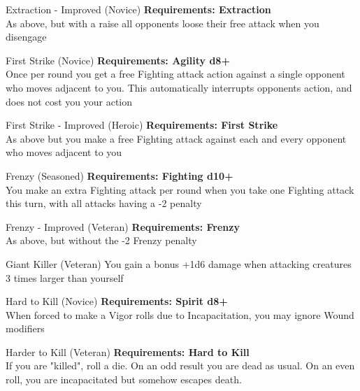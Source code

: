 \begin{multicols}{2}
\begin{genericsection}{Extraction - Improved (Novice)}
\textbf{Requirements: Extraction}\\
As above, but with a raise all opponents loose their free attack when you disengage
\end{genericsection}

\begin{genericsection}{First Strike (Novice)}
\textbf{Requirements: Agility d8+}\\
Once per round you get a free Fighting attack action against a single opponent who moves adjacent to you. This automatically interrupts opponents action, and does not cost you your action
\end{genericsection}

\begin{genericsection}{First Strike - Improved (Heroic)}
\textbf{Requirements: First Strike}\\
As above but you make a free Fighting attack against each and every opponent who moves adjacent to you
\end{genericsection}

\begin{genericsection}{Frenzy (Seasoned)}
\textbf{Requirements: Fighting d10+}\\
You make an extra Fighting attack per round when you take one Fighting attack this turn, with all attacks having a -2 penalty
\end{genericsection}

\begin{genericsection}{Frenzy - Improved (Veteran)}
\textbf{Requirements: Frenzy}\\
As above, but without the -2 Frenzy penalty
\end{genericsection}

\begin{genericsection}{Giant Killer (Veteran)}
You gain a bonus +1d6 damage when attacking creatures 3 times larger than yourself
\end{genericsection}

\begin{genericsection}{Hard to Kill (Novice)}
\textbf{Requirements: Spirit d8+}\\
When forced to make a Vigor rolls due to Incapacitation, you may ignore Wound modifiers
\end{genericsection}

\begin{genericsection}{Harder to Kill (Veteran)}
\textbf{Requirements: Hard to Kill}\\
If you are "killed", roll a die. On an odd result you are dead as usual. On an even roll, you are incapacitated but somehow escapes death.
\end{genericsection}


\end{multicols}
